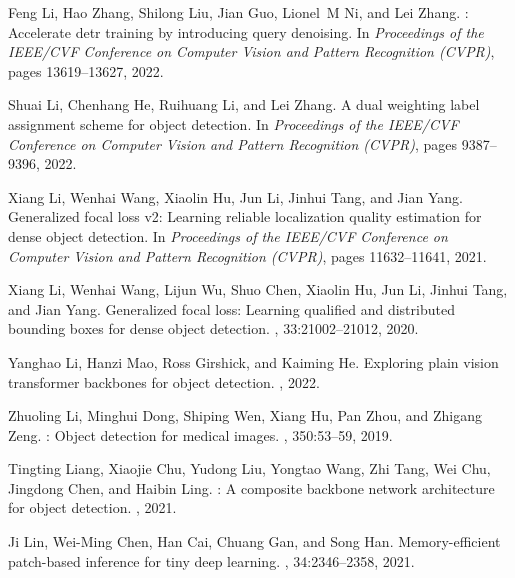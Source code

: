 \documentclass[10pt,twocolumn,letterpaper]{article}
\begin{document}
{\begin{thebibliography}{100}
				Feng Li, Hao Zhang, Shilong Liu, Jian Guo, Lionel~M Ni, and Lei Zhang.
				: Accelerate detr training by introducing query denoising.
				\newblock In {\em Proceedings of the IEEE/CVF Conference on Computer Vision and
					Pattern Recognition (CVPR)}, pages 13619--13627, 2022.
				
				Shuai Li, Chenhang He, Ruihuang Li, and Lei Zhang.
				\newblock A dual weighting label assignment scheme for object detection.
				\newblock In {\em Proceedings of the IEEE/CVF Conference on Computer Vision and
					Pattern Recognition (CVPR)}, pages 9387--9396, 2022.
				
				Xiang Li, Wenhai Wang, Xiaolin Hu, Jun Li, Jinhui Tang, and Jian Yang.
				\newblock Generalized focal loss v2: Learning reliable localization quality
				estimation for dense object detection.
				\newblock In {\em Proceedings of the IEEE/CVF Conference on Computer Vision and
					Pattern Recognition (CVPR)}, pages 11632--11641, 2021.
				
				Xiang Li, Wenhai Wang, Lijun Wu, Shuo Chen, Xiaolin Hu, Jun Li, Jinhui Tang,
				and Jian Yang.
				\newblock Generalized focal loss: Learning qualified and distributed bounding
				boxes for dense object detection.
				,
				33:21002--21012, 2020.
				
				Yanghao Li, Hanzi Mao, Ross Girshick, and Kaiming He.
				\newblock Exploring plain vision transformer backbones for object detection.
				, 2022.
				
				Zhuoling Li, Minghui Dong, Shiping Wen, Xiang Hu, Pan Zhou, and Zhigang Zeng.
				: Object detection for medical images.
				, 350:53--59, 2019.
				
				Tingting Liang, Xiaojie Chu, Yudong Liu, Yongtao Wang, Zhi Tang, Wei Chu,
				Jingdong Chen, and Haibin Ling.
				: A composite backbone network architecture for object
				detection.
				, 2021.
				
				Ji Lin, Wei-Ming Chen, Han Cai, Chuang Gan, and Song Han.
				\newblock Memory-efficient patch-based inference for tiny deep learning.
				,
				34:2346--2358, 2021.
				

\end{thebibliography}}
\end{document}
